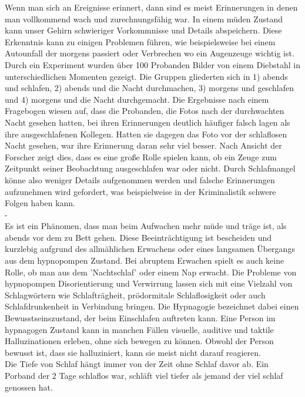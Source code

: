 \cite{online:streiche}

Wenn man sich an Ereignisse erinnert, dann sind es meist Erinnerungen in denen man vollkommend wach und zurechnungsfähig war. In einem müden Zustand kann unser Gehirn schwieriger Vorkommnisse und Details abspeichern. Diese Erkenntnis kann zu einigen Problemen führen, wie beispielsweise bei einem Autounfall der morgens passiert oder Verbrechen wo ein Augenzeuge wichtig ist. Durch ein Experiment wurden über 100 Probanden Bilder von einem Diebstahl in unterschiedlichen Momenten gezeigt. Die Gruppen gliederten sich in 1) abends und schlafen, 2) abends und die Nacht durchmachen, 3) morgens und geschlafen und 4) morgens und die Nacht durchgemacht. Die Ergebnisse nach einem Fragebogen wiesen auf, dass die Probanden, die Fotos nach der durchwachten Nacht gesehen hatten, bei ihren Erinnerungen deutlich häufiger falsch lagen als ihre ausgeschlafenen Kollegen. Hatten sie dagegen das Foto vor der schlaflosen Nacht gesehen, war ihre Erinnerung daran sehr viel besser. Nach Ansicht der Forscher zeigt dies, dass es eine große Rolle spielen kann, ob ein Zeuge zum Zeitpunkt seiner Beobachtung ausgeschlafen war oder nicht. Durch Schlafmangel könne also weniger Details aufgenommen werden und falsche Erinnerungen aufzunehmen wird gefordert, was beispielweise in der Kriminalistik schwere Folgen haben kann.\\


-\cite{dinges1990you}\\
Es ist ein Phänomen, dass man beim Aufwachen mehr müde und träge ist, als abends vor dem zu Bett gehen. Diese Beeinträchtigung ist bescheiden und kurzlebig aufgrund des allmählichen Erwachens oder eines langsamen Übergangs aus dem hypnopompen Zustand. Bei abruptem Erwachen spielt es auch keine Rolle, ob man aus dem 'Nachtschlaf' oder einem Nap erwacht. Die Probleme von hypnopompen Disorientierung und Verwirrung lassen sich mit eine Vielzahl von Schlagwörtern wie Schlafträgheit, prödormitale Schlaflosigkeit oder auch Schlafdrunkenheit in Verbindung bringen. Die Hypnagogie bezeichnet dabei einen Bewusstseinszustand, der beim Einschlafen auftreten kann. Eine Person im hypnagogen Zustand kann in manchen Fällen visuelle, auditive und taktile Halluzinationen erleben, ohne sich bewegen zu können. Obwohl der Person bewusst ist, dass sie halluziniert, kann sie meist nicht darauf reagieren.\\
Die Tiefe von Schlaf hängt immer von der Zeit ohne Schlaf davor ab. Ein Porband der 2 Tage schlaflos war, schläft viel tiefer als jemand der viel schlaf genossen hat.\\%

